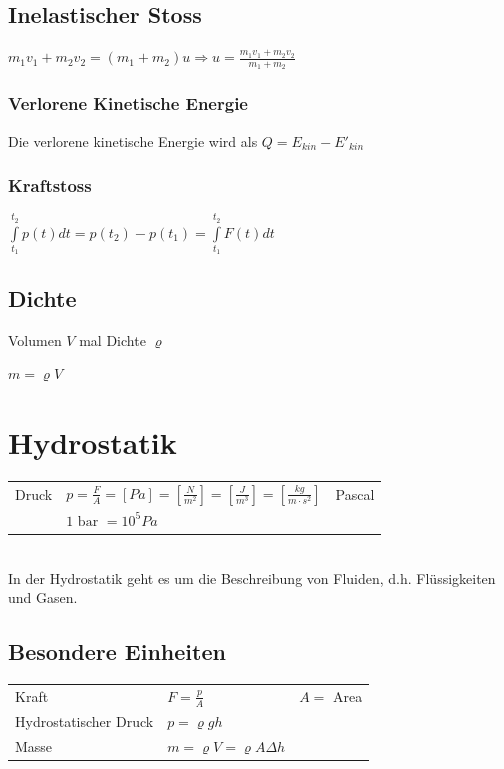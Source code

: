 \documentclass[a4paper]{scrartcl}
\begin{document}
\subsection{Inelastischer Stoss}

	$m_1 v_1 + m_2 v_2 = (m_1 + m_2) u \Rightarrow u = \frac{m_1 v_1 + m_2 v_2}{m_1 + m_2}$

\subsubsection{Verlorene Kinetische Energie}

	Die verlorene kinetische Energie wird als $Q = E_{kin}  - E'_{kin}$

\subsubsection{Kraftstoss}

	$\int\limits^{t_2}_{t_1} p(t) dt = p(t_2) - p(t_1) = \int\limits^{t_2}_{t_1} F(t) dt$


\subsection{Dichte}

	Volumen $V$ mal Dichte $\varrho$
	 
	$m = \varrho V$

\section{Hydrostatik}
	\begin{tabu} {l X l}
		\hline
		Druck
		&	$p = \frac{F}{A} = \left[ Pa \right] = \left[ \frac{N}{m^2} \right] = \left[ \frac{J}{m^3} \right] = \left[ \frac{kg}{m \cdot s^2} \right]$
		&	Pascal \\
		& $1 \text{ bar } = 10^5 Pa$
		\\ \hline
	\end{tabu}

	\hfill \\
	In der Hydrostatik geht es um die Beschreibung von Fluiden, d.h. Flüssigkeiten und Gasen.

\subsection{Besondere Einheiten} %
	\begin{tabu} {l X r}
		Kraft & $F = \frac{p}{A}$ & $A =$ Area\\
		Hydrostatischer Druck & $p = \varrho g h$ & \\
		Masse & $m = \varrho V = \varrho A \Delta h$
	\end{tabu}
\end{document}
